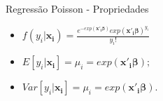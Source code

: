 \documentclass[10pt, aspectratio=169]{beamer}
\begin{document}



\begin{frame}{Regressão Poisson - Propriedades} 


\vspace{0,8cm}  
    
    \begin{itemize}
        
        \item $f(y_{i}|\boldsymbol{x_{i}})=\frac{e^{-exp(\boldsymbol{x'_i\beta})}{exp({\boldsymbol{x'_i\beta}})}^{y_i}}{y_i!}$
        

  
  \vspace{0,8cm}  

        
        \item $E\left [ y_{i}|\boldsymbol{x_{i}} \right ]= \mu_{i}=exp\left ( \boldsymbol{x'_{i}\beta} \right );$

\vspace{0,8cm}  
   
        \item $Var\left [ y_{i}|\mathbf{x_{i}} \right ]= \mu_{i}=exp\left ( \boldsymbol{x'_{i}\beta} \right ).$
    

    
    
\end{itemize}

\end{frame}






\end{document}
